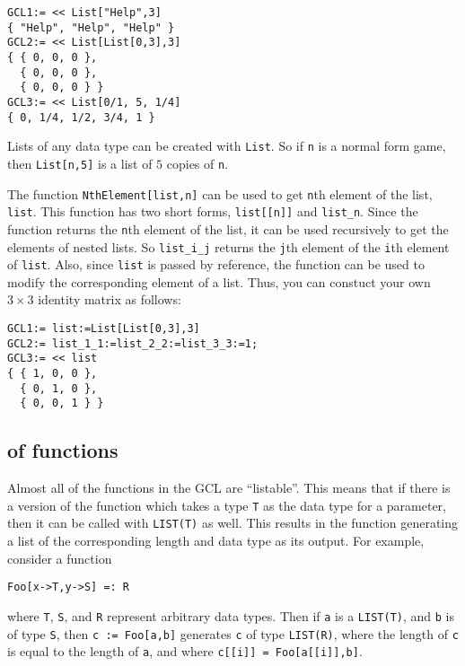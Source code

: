 \begin{verbatim}
GCL1:= << List["Help",3]
{ "Help", "Help", "Help" }
GCL2:= << List[List[0,3],3]
{ { 0, 0, 0 },
  { 0, 0, 0 },
  { 0, 0, 0 } }
GCL3:= << List[0/1, 5, 1/4]
{ 0, 1/4, 1/2, 3/4, 1 }
\end{verbatim}

\noindent
Lists of any data type can be created with \verb+List+.  So if
\verb+n+ is a normal form game, then \verb+List[n,5]+ is a list of $5$
copies of \verb+n+.

The function \verb+NthElement[list,n]+ can be used
to get \verb+n+th element of the list, \verb+list+.  This function has
two short forms, \verb+list[[n]]+ and \verb+list_n+.  Since the
function returns the \verb+n+th element of the list, it can be used
recursively to get the elements of nested lists.  So \verb+list_i_j+
returns the \verb+j+th element of the \verb+i+th element of
\verb+list+.  Also, since \verb+list+ is passed by reference, the
function can be used to modify the corresponding element of a list.
Thus, you can constuct your own $3\times 3$ identity matrix as
follows:

\begin{verbatim}
GCL1:= list:=List[List[0,3],3]
GCL2:= list_1_1:=list_2_2:=list_3_3:=1;
GCL3:= << list
{ { 1, 0, 0 },
  { 0, 1, 0 },
  { 0, 0, 1 } }
\end{verbatim}


\subsection{ of functions}

Almost all of the functions in the GCL are ``listable''.  This means
that if there is a version of the function which takes a type \verb+T+
as the data type for a parameter, then it can be called with
\verb+LIST(T)+ as well.  This results in the function generating a
list of the corresponding length and data type as its output.  For
example, consider a function

\begin{verbatim}
Foo[x->T,y->S] =: R
\end{verbatim}

\noindent
where \verb+T+, \verb+S+, and \verb+R+ represent arbitrary data types.
Then if \verb+a+ is a \verb+LIST(T)+, and \verb+b+ is of type
\verb+S+, then \verb+c := Foo[a,b]+ generates \verb+c+ of type
\verb+LIST(R)+, where the length of \verb+c+ is equal to the length of
\verb+a+, and where \verb+c[[i]] = Foo[a[[i]],b]+.

